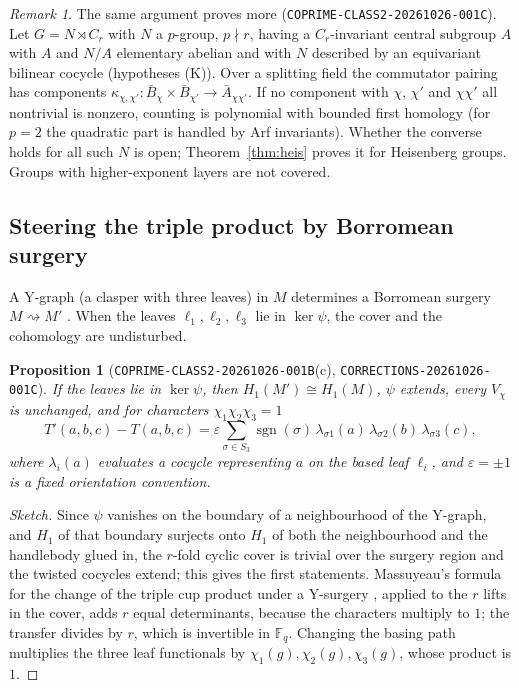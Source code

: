 \documentclass[11pt]{article}
\newtheorem{proposition}[theorem]{Proposition}
\theoremstyle{definition}
\theoremstyle{remark}
\newtheorem{remark}[theorem]{Remark}
\newcommand{\F}{\mathbb{F}}
\begin{document}
\begin{remark}\label{rem:K}
The same argument proves more (\texttt{COPRIME-CLASS2-20261026-001C}). Let
$G=N\rtimes C_r$ with $N$ a $p$-group, $p\nmid r$, having a $C_r$-invariant
central subgroup $A$ with $A$ and $N/A$ elementary abelian and with
$N$ described by an equivariant bilinear cocycle (hypotheses (K)). Over a
splitting field the commutator pairing has components
$\kappa_{\chi,\chi'}\colon\bar B_\chi\times\bar B_{\chi'}\to\bar
A_{\chi\chi'}$. If no component with $\chi$, $\chi'$ and $\chi\chi'$ all
nontrivial is nonzero, counting is polynomial with bounded first homology
(for $p=2$ the quadratic part is handled by Arf invariants). Whether the
converse holds for all such $N$ is open; Theorem~\ref{thm:heis} proves it for
Heisenberg groups. Groups with higher-exponent layers are not covered.
\end{remark}

\subsection{Steering the triple product by Borromean surgery}

A Y-graph (a clasper with three leaves) in $M$ determines a Borromean surgery
$M\rightsquigarrow M'$ \cite{Mat87,Hab00}. When the leaves $\ell_1,\ell_2,
\ell_3$ lie in $\ker\psi$, the cover and the cohomology are undisturbed.

\begin{proposition}[\texttt{COPRIME-CLASS2-20261026-001B}(c), \texttt{CORRECTIONS-20261026-001C}]\label{prop:steer}
If the leaves lie in $\ker\psi$, then $H_1(M')\cong H_1(M)$, $\psi$ extends,
every $V_\chi$ is unchanged, and for characters $\chi_1\chi_2\chi_3=1$
\[
T'(a,b,c)-T(a,b,c)=\varepsilon\sum_{\sigma\in S_3}\operatorname{sgn}(\sigma)\,
\lambda_{\sigma1}(a)\,\lambda_{\sigma2}(b)\,\lambda_{\sigma3}(c),
\]
where $\lambda_i(a)$ evaluates a cocycle representing $a$ on the based leaf
$\ell_i$, and $\varepsilon=\pm1$ is a fixed orientation convention.
\end{proposition}

\begin{proof}[Sketch]
Since $\psi$ vanishes on the boundary of a neighbourhood of the Y-graph, and
$H_1$ of that boundary surjects onto $H_1$ of both the neighbourhood and the
handlebody glued in, the $r$-fold cyclic cover is trivial over the surgery
region and the twisted cocycles extend; this gives the first statements.
Massuyeau's formula for the change of the triple cup product under a
Y-surgery \cite[Lemma~3.2]{Mas03}, applied to the $r$ lifts in the cover,
adds $r$ equal determinants, because the characters multiply to $1$; the
transfer divides by $r$, which is invertible in $\F_q$. Changing the basing
path multiplies the three leaf functionals by $\chi_1(g),\chi_2(g),\chi_3(g)$,
whose product is $1$.
\end{proof}
\end{document}
